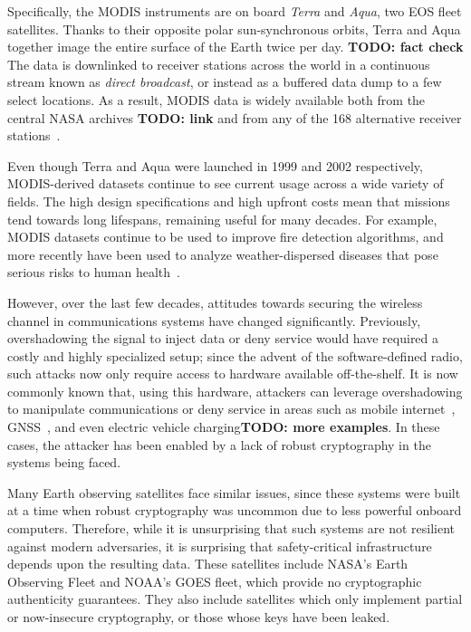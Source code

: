 Specifically, the MODIS instruments are on board \textit{Terra} and \textit{Aqua}, two EOS fleet satellites.
Thanks to their opposite polar sun-synchronous orbits, Terra and Aqua together image the entire surface of the Earth twice per day. \textbf{TODO: fact check}
The data is downlinked to receiver stations across the world in a continuous stream known as \textit{direct broadcast}, or instead as a buffered data dump to a few select locations.
As a result, MODIS data is widely available both from the central NASA archives \textbf{TODO: link} and from any of the 168 alternative receiver stations~\cite{nasaDirect}.

Even though Terra and Aqua were launched in 1999 and 2002 respectively, MODIS-derived datasets continue to see current usage across a wide variety of fields.
The high design specifications and high upfront costs mean that missions tend towards long lifespans, remaining useful for many decades.
For example, MODIS datasets continue to be used to improve fire detection algorithms, and more recently have been used to analyze weather-dispersed diseases that pose serious risks to human health~\cite{valleyFever}.

However, over the last few decades, attitudes towards securing the wireless channel in communications systems have changed significantly.
Previously, overshadowing the signal to inject data or deny service would have required a costly and highly specialized setup; since the advent of the software-defined radio, such attacks now only require access to hardware available off-the-shelf.
It is now commonly known that, using this hardware, attackers can leverage overshadowing to manipulate communications or deny service in areas such as mobile internet~\cite{yang2019hiding,erni2021adaptover}, GNSS~\cite{tippenhauer2011requirements}, and even electric vehicle charging\textbf{TODO: more examples}.
In these cases, the attacker has been enabled by a lack of robust cryptography in the systems being faced. %


Many Earth observing satellites face similar issues, since these systems were built at a time when robust cryptography was uncommon due to less powerful onboard computers.
Therefore, while it is unsurprising that such systems are not resilient against modern adversaries, it is surprising that safety-critical infrastructure depends upon the resulting data.
These satellites include NASA's Earth Observing Fleet and NOAA's GOES fleet, which provide no cryptographic authenticity guarantees.
They also include satellites which only implement partial or now-insecure cryptography, or those whose keys have been leaked.

